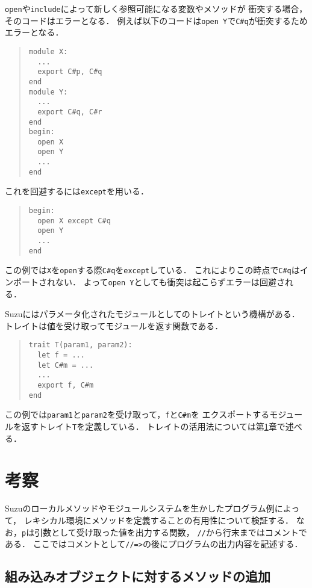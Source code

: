 \documentclass[a4paper,11pt,dvipdfmx]{jreport}
\begin{document}
\verb|open|や\verb|include|によって新しく参照可能になる変数やメソッドが
衝突する場合，そのコードはエラーとなる．
例えば以下のコードは\verb|open Y|で\verb|C#q|が衝突するためエラーとなる．
\begin{quote}
\begin{verbatim}
module X:
  ... 
  export C#p, C#q
end
module Y:
  ...
  export C#q, C#r
end
begin:
  open X
  open Y
  ...
end
\end{verbatim}
\end{quote}
これを回避するには\verb|except|を用いる．
\begin{quote}
\begin{verbatim}
begin:
  open X except C#q
  open Y
  ...
end
\end{verbatim}
\end{quote}
この例では\verb|X|を\verb|open|する際\verb|C#q|を\verb|except|している．
これによりこの時点で\verb|C#q|はインポートされない．
よって\verb|open Y|としても衝突は起こらずエラーは回避される．

Suzuにはパラメータ化されたモジュールとしてのトレイトという機構がある．
トレイトは値を受け取ってモジュールを返す関数である．
\begin{quote}
\begin{verbatim}
trait T(param1, param2):
  let f = ...
  let C#m = ...
  ...
  export f, C#m
end
\end{verbatim}
\end{quote}
この例では\verb|param1|と\verb|param2|を受け取って，\verb|f|と\verb|C#m|を
エクスポートするモジュールを返すトレイト\verb|T|を定義している．
トレイトの活用法については第\ref{chapter:discussion}章で述べる．


\chapter{考察}
\label{chapter:discussion}

Suzuのローカルメソッドやモジュールシステムを生かしたプログラム例によって，
レキシカル環境にメソッドを定義することの有用性について検証する．
なお，\verb|p|は引数として受け取った値を出力する関数，
\verb|//|から行末まではコメントである．
ここではコメントとして\verb|//=>|の後にプログラムの出力内容を記述する．

\section{組み込みオブジェクトに対するメソッドの追加}
\end{document}
